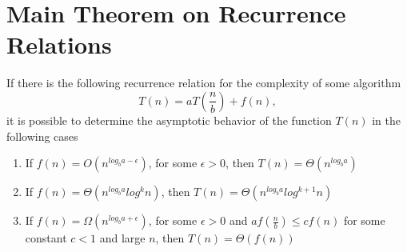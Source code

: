 \section{Main Theorem on Recurrence Relations}

\begin{theorem}
\label{addAlgoMasterTheorem}
If there is the following recurrence relation for the complexity
of some algorithm
\[
T\left( n \right ) = a T \left( \frac{n}{b} \right) + f\left( n \right ),
\]
it is possible to determine the asymptotic behavior of the function 
$T\left( n\right ) $ in the following cases
\begin{enumerate}
\item If $f\left(n\right) = O\left( n^{log_ba - \epsilon}\right)$,
  for some $\epsilon > 0$, then 
$T\left(n\right) = \Theta\left(n^{log_ba}\right)$
\item If 
$f\left(n\right) = \Theta\left( n^{log_ba}log^{k}n\right)$, then 
$T\left(n\right) = \Theta\left(n^{log_ba}log^{k + 1}n\right)$
\item If $f\left(n\right) = \Omega\left( n^{log_ba + \epsilon}\right)$,
  for some $\epsilon > 0$ and $a f\left(\frac{n}{b}\right) \le c f
  \left( n \right)$ for some constant $c < 1$ and large $n$, then 
$T\left(n\right) = \Theta\left(f\left(n\right)\right)$
\end{enumerate}
\end{theorem}